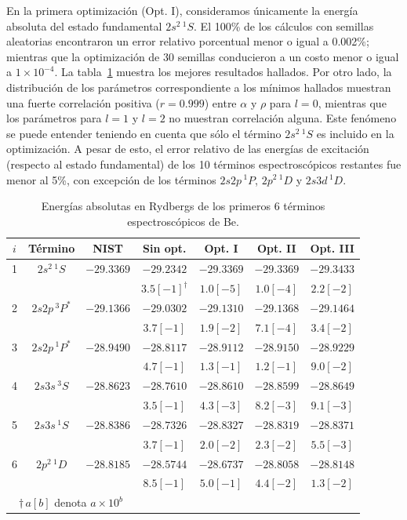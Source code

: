 En la primera optimización (Opt. I), consideramos únicamente la energía
absoluta del estado fundamental $2s^2\,^1S$. El 100\% de los cálculos con
semillas aleatorias encontraron un error relativo porcentual menor o 
igual a 0.002\%; mientras que la optimización de 30 semillas conducieron 
a un costo menor o igual a $1\times 10^{-4}$. La tabla~\ref{tab:optpol} 
muestra los mejores resultados hallados. Por otro lado, la distribución 
de los parámetros correspondiente a los mínimos hallados muestran una 
fuerte correlación positiva ($r=0.999$) entre $\alpha $ y $\rho$ para 
$l=0$, mientras que los parámetros para $l=1$ y $l=2$ no muestran 
correlación alguna. Este fenómeno se puede entender teniendo en cuenta 
que sólo el término $2s^2\,^1S$ es incluido en la optimización. A pesar 
de esto, el error relativo de las energías de excitación (respecto al 
estado fundamental) de los 10 términos espectroscópicos restantes fue 
menor al 5\%, con excepción de los términos $2s2p\,^1P$, $2p^2\,^1D$ y 
$2s3d\,^1D$.

\begin{table}
\centering
\begin{tabular}{|*{7}{c|}}
\hline 
$i$ & Término   & NIST & Sin opt.   & Opt. I       & Opt. II      & Opt. III \\
\hline 
\hline 
1 &$2s^2\,^1S$  & $-29.3369$ & $-29.2342$ & $-29.3369$ & $-29.3369$ & $-29.3433$ \\
  &          &        & $3.5[-1]^\dagger$ & $1.0[-5]$  & $1.0[-4]$  & $2.2[-2]$  \\
2 &$2s2p\,^3P^*$& $-29.1366$ & $-29.0302$ & $-29.1310$ & $-29.1368$ & $-29.1464$ \\
  &             &            & $3.7[-1]$  & $1.9[-2]$  & $7.1[-4]$  & $3.4[-2]$  \\
3 &$2s2p\,^1P^*$& $-28.9490$ & $-28.8117$ & $-28.9112$ & $-28.9150$ & $-28.9229$ \\
  &             &            & $4.7[-1]$  & $1.3[-1]$  & $1.2[-1]$  & $9.0[-2]$  \\
4 &$2s3s\,^3S$  & $-28.8623$ & $-28.7610$ & $-28.8610$ & $-28.8599$ & $-28.8649$ \\
  &             &            & $3.5[-1]$  & $4.3[-3]$  & $8.2[-3]$  & $9.1[-3]$  \\
5 &$2s3s\,^1S$  & $-28.8386$ & $-28.7326$ & $-28.8327$ & $-28.8319$ & $-28.8371$ \\
  &             &            & $3.7[-1]$  & $2.0[-2]$  & $2.3[-2]$  & $5.5[-3]$  \\
6 &$2p^2\,^1D$  & $-28.8185$ & $-28.5744$ & $-28.6737$ & $-28.8058$ & $-28.8148$ \\
  &             &            & $8.5[-1]$  & $5.0[-1]$  & $4.4[-2]$  & $1.3[-2]$  \\
\hline\multicolumn{3}{c}{$\dagger\,a[b]$ denota $a\times 10^b$} \\
\end{tabular}
\caption[Energías absolutas de Be.]
{Energías absolutas en Rydbergs de los primeros 6 términos espectroscópicos 
de Be. }
\label{tab:optpol}
\end{table}

